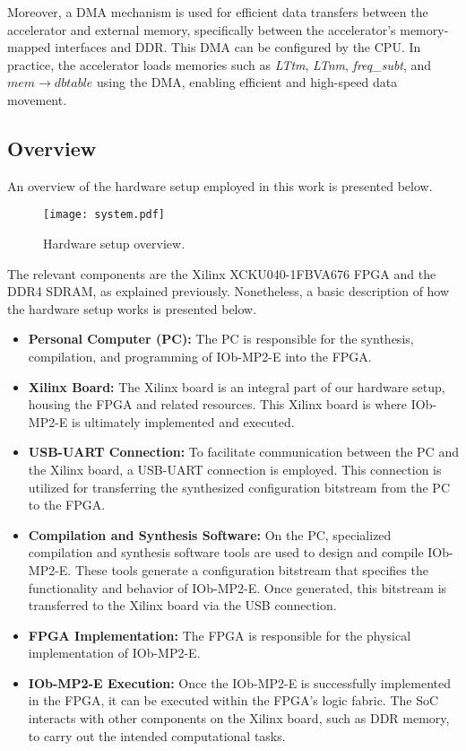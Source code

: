 Moreover, a DMA mechanism is used for efficient data transfers between the accelerator and external memory, specifically between the accelerator's memory-mapped interfaces and DDR. This DMA can be configured by the CPU. In practice, the accelerator loads memories such as \textit{LTtm}, \textit{LTnm}, \textit{freq\_subt}, and $mem\to dbtable$ using the DMA, enabling efficient and high-speed data movement.

\subsection{Overview}

An overview of the hardware setup employed in this work is presented below.

\vspace{0.1cm}

\begin{figure}[H]
\centerline{\texttt{[image: system.pdf]}}
\caption{Hardware setup overview.}
\label{system}
\end{figure}

The relevant components are the Xilinx XCKU040-1FBVA676 FPGA and the DDR4 SDRAM, as explained previously. Nonetheless, a basic description of how the hardware setup works is presented below.

\begin{itemize}
    \item \textbf{Personal Computer (PC):} The PC is responsible for the synthesis, compilation, and programming of IOb-MP2-E into the FPGA.
    \item \textbf{Xilinx Board:} The Xilinx board is an integral part of our hardware setup, housing the FPGA and related resources. This Xilinx board is where IOb-MP2-E is ultimately implemented and executed.
    \item \textbf{USB-UART Connection:} To facilitate communication between the PC and the Xilinx board, a USB-UART connection is employed. This connection is utilized for transferring the synthesized configuration bitstream from the PC to the FPGA.
    \item \textbf{Compilation and Synthesis Software:} On the PC, specialized compilation and synthesis software tools are used to design and compile IOb-MP2-E. These tools generate a configuration bitstream that specifies the functionality and behavior of IOb-MP2-E. Once generated, this bitstream is transferred to the Xilinx board via the USB connection.
    \item \textbf{FPGA Implementation:} The FPGA is responsible for the physical implementation of IOb-MP2-E.
    \item \textbf{IOb-MP2-E Execution:} Once the IOb-MP2-E is successfully implemented in the FPGA, it can be executed within the FPGA's logic fabric. The SoC interacts with other components on the Xilinx board, such as DDR memory, to carry out the intended computational tasks.
\end{itemize}

